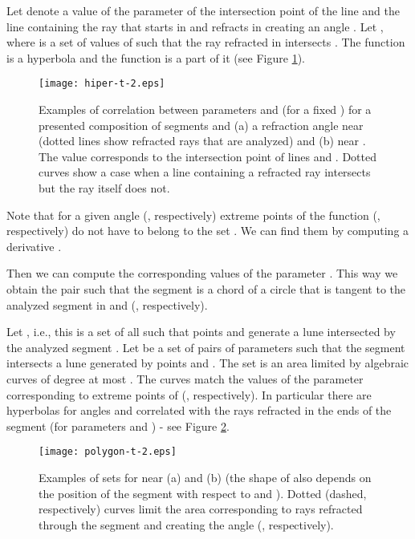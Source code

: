 \documentclass[11pt]{llncs}
\begin{document}
 Let  denote a value of the parameter  of the intersection point
of the line  and the line containing the ray that starts in  and refracts
in  creating an angle . Let , where  is 
a set of values of  such that the ray refracted in  intersects . 
The function  is a hyperbola and the function  is a part of it
(see Figure \ref{fig:hiper}).



\begin{figure}[htbp]
\centering
\texttt{[image: hiper-t-2.eps]}
\caption{Examples of correlation between parameters  and  (for a fixed ) 
for a presented composition of segments and (a) a refraction angle near  
(dotted lines show refracted rays that are analyzed) and (b) near . 
The value  corresponds to the intersection point of lines  and .
 Dotted curves show a case when a line containing a refracted ray intersects 
 but the ray itself does not. }
\label{fig:hiper}
\end{figure}





 Note that for a given angle  (, respectively) extreme points
of the function   (, respectively) do not have to 
belong to the set . We can find them by computing a derivative
. 


Then we can compute the corresponding values of the parameter . 
This way we obtain the pair  such that the segment 
is a chord of a circle that is tangent to the analyzed segment  in  and
 (,
respectively).  







 Let ,
i.e., this is a set of all  such that points  and  generate 
a lune intersected by the analyzed segment .
Let  be a set of pairs 
of parameters  such that the segment  intersects a lune generated by points 
 and .
The set  is an area limited by  algebraic curves 
of degree at most . 
The curves match the values of the parameter  corresponding 
to extreme points of  (, respectively). In particular 
there are hyperbolas for angles  and  correlated with the rays refracted 
in the ends of the segment  (for parameters  and ) - see 
Figure \ref{fig:polygon}.

\begin{figure}[htbp]
\centering
\texttt{[image: polygon-t-2.eps]}
\caption{ Examples of sets  for  near (a)  and (b)  
(the shape of  also depends on the position of the segment  with respect 
to  and ). Dotted (dashed, respectively) curves limit the area corresponding 
to rays refracted through the segment  and creating the angle  (, 
respectively).} 
\label{fig:polygon}
\end{figure}
\end{document}
